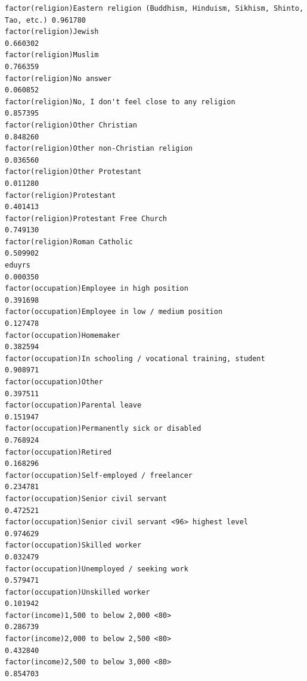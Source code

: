 \documentclass[
]{article}
\begin{document}
\begin{table}
\begin{minipage}[t]{\linewidth}
{\begin{verbatim}
factor(religion)Eastern religion (Buddhism, Hinduism, Sikhism, Shinto, Tao, etc.) 0.961780
factor(religion)Jewish                                                            0.660302
factor(religion)Muslim                                                            0.766359
factor(religion)No answer                                                         0.060852
factor(religion)No, I don't feel close to any religion                            0.857395
factor(religion)Other Christian                                                   0.848260
factor(religion)Other non-Christian religion                                      0.036560
factor(religion)Other Protestant                                                  0.011280
factor(religion)Protestant                                                        0.401413
factor(religion)Protestant Free Church                                            0.749130
factor(religion)Roman Catholic                                                    0.509902
eduyrs                                                                            0.000350
factor(occupation)Employee in high position                                       0.391698
factor(occupation)Employee in low / medium position                               0.127478
factor(occupation)Homemaker                                                       0.382594
factor(occupation)In schooling / vocational training, student                     0.908971
factor(occupation)Other                                                           0.397511
factor(occupation)Parental leave                                                  0.151947
factor(occupation)Permanently sick or disabled                                    0.768924
factor(occupation)Retired                                                         0.168296
factor(occupation)Self-employed / freelancer                                      0.234781
factor(occupation)Senior civil servant                                            0.472521
factor(occupation)Senior civil servant <96> highest level                         0.974629
factor(occupation)Skilled worker                                                  0.032479
factor(occupation)Unemployed / seeking work                                       0.579471
factor(occupation)Unskilled worker                                                0.101942
factor(income)1,500 to below 2,000 <80>                                           0.286739
factor(income)2,000 to below 2,500 <80>                                           0.432840
factor(income)2,500 to below 3,000 <80>                                           0.854703

\end{verbatim}}
\end{minipage}
\end{table}
\end{document}
